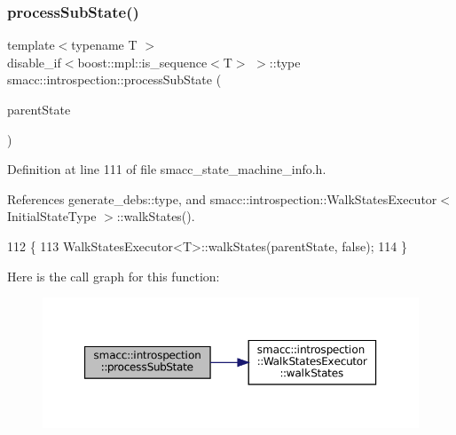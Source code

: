 \subsubsection{\texorpdfstring{process\+Sub\+State()}{processSubState()}\hspace{0.1cm}{\footnotesize\ttfamily [1/2]}}
{\footnotesize\ttfamily template$<$typename T $>$ \\
disable\+\_\+if$<$boost\+::mpl\+::is\+\_\+sequence$<$T$>$ $>$\+::type smacc\+::introspection\+::process\+Sub\+State (\begin{DoxyParamCaption}\item[{std\+::shared\+\_\+ptr$<$ \hyperlink{classsmacc_1_1introspection_1_1SmaccStateInfo}{Smacc\+State\+Info} $>$ \&}]{parent\+State }\end{DoxyParamCaption})}



Definition at line 111 of file smacc\+\_\+state\+\_\+machine\+\_\+info.\+h.



References generate\+\_\+debs\+::type, and smacc\+::introspection\+::\+Walk\+States\+Executor$<$ Initial\+State\+Type $>$\+::walk\+States().


\begin{DoxyCode}
112 \{
113     WalkStatesExecutor<T>::walkStates(parentState, \textcolor{keyword}{false});
114 \}
\end{DoxyCode}
Here is the call graph for this function\+:
\nopagebreak
\begin{figure}[H]
\begin{center}
\leavevmode
\includegraphics[width=350pt]{namespacesmacc_1_1introspection_a2911e2897a4572095bc9e7bc75e3a728_cgraph}
\end{center}
\end{figure}
\mbox{\label{namespacesmacc_1_1introspection_a14818620c2ac312e0622b241dcddceaa}} 

